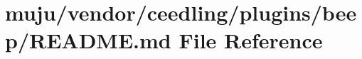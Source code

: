 \hypertarget{vendor_2ceedling_2plugins_2beep_2_r_e_a_d_m_e_8md}{}\section{muju/vendor/ceedling/plugins/beep/\+R\+E\+A\+D\+ME.md File Reference}
\label{vendor_2ceedling_2plugins_2beep_2_r_e_a_d_m_e_8md}
